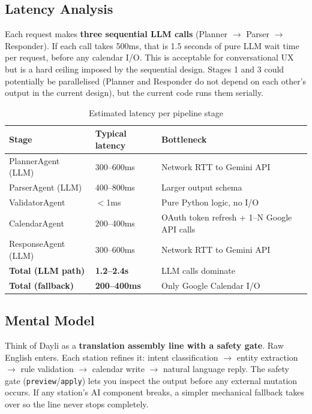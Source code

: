\documentclass[12pt, a4paper]{article}
\begin{document}
\subsection{Latency Analysis}

\begin{warnbox}
  Each request makes \textbf{three sequential LLM calls} (Planner $\to$ Parser $\to$ Responder). If each call takes 500ms, that is 1.5 seconds of pure LLM wait time per request, before any calendar I/O. This is acceptable for conversational UX but is a hard ceiling imposed by the sequential design. Stages 1 and 3 could potentially be parallelised (Planner and Responder do not depend on each other's output in the current design), but the current code runs them serially.
\end{warnbox}

\begin{table}[htbp]
\centering
\small
\renewcommand{\arraystretch}{1.4}
\begin{tabularx}{\textwidth}{L{3.5cm} L{2.5cm} X}
\toprule
\textbf{Stage} & \textbf{Typical latency} & \textbf{Bottleneck} \\
\midrule
PlannerAgent (LLM) & 300--600ms & Network RTT to Gemini API \\
ParserAgent (LLM)  & 400--800ms & Larger output schema \\
ValidatorAgent     & $<$1ms     & Pure Python logic, no I/O \\
CalendarAgent      & 200--400ms & OAuth token refresh + 1--N Google API calls \\
ResponseAgent (LLM)& 300--600ms & Network RTT to Gemini API \\
\midrule
\textbf{Total (LLM path)} & \textbf{1.2--2.4s} & LLM calls dominate \\
\textbf{Total (fallback)}  & \textbf{200--400ms} & Only Google Calendar I/O \\
\bottomrule
\end{tabularx}
\caption{Estimated latency per pipeline stage}
\end{table}

\subsection{Mental Model}

Think of Dayli as a \textbf{translation assembly line with a safety gate}. Raw English enters. Each station refines it: intent classification $\to$ entity extraction $\to$ rule validation $\to$ calendar write $\to$ natural language reply. The safety gate (\texttt{preview}/\texttt{apply}) lets you inspect the output before any external mutation occurs. If any station's AI component breaks, a simpler mechanical fallback takes over so the line never stops completely.
\end{document}
